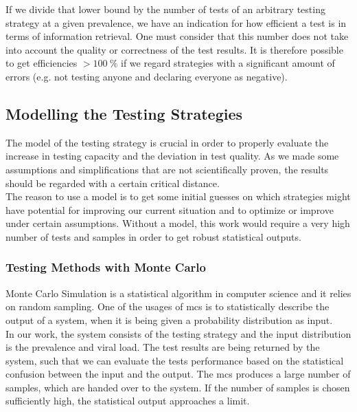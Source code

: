 \documentclass[fleqn,10pt]{wlscirep}
\begin{document}
	If we divide that lower bound by the number of tests of an arbitrary testing strategy at a given prevalence, we have an indication for how efficient a test is in terms of information retrieval. One must consider that this number does not take into account the quality or correctness of the test results. It is therefore possible to get efficiencies $> \SI{100}{\percent} $ if we regard strategies with a significant amount of errors (e.g. not testing anyone and declaring everyone as negative). 
	
	
	\subsection{Modelling the Testing Strategies}
	
	The model of the testing strategy is crucial in order to properly evaluate the increase in testing capacity and the deviation in test quality. As we made some assumptions and simplifications that are not scientifically proven, the results should be regarded with a certain critical distance. \\
	
	The reason to use a model is to get some initial guesses on which strategies might have potential for improving our current situation and to optimize or improve under certain assumptions. Without a model, this work would require a very high number of tests and samples in order to get robust statistical outputs.
	
	\subsubsection{Testing Methods with Monte Carlo}
	
	Monte Carlo Simulation is a statistical algorithm in computer science and it relies on random sampling. One of the usages of \gls{mcs} is to statistically describe the output of a system, when it is being given a probability distribution as input. \\
	
	In our work, the system consists of the testing strategy and the input distribution is the prevalence and viral load. The test results are being returned by the system, such that we can evaluate the tests performance based on the statistical confusion between the input and the output. The \gls{mcs} produces a large number of samples, which are handed over to the system. If the number of samples is chosen sufficiently high, the statistical output approaches a limit.\\
	
\end{document}
